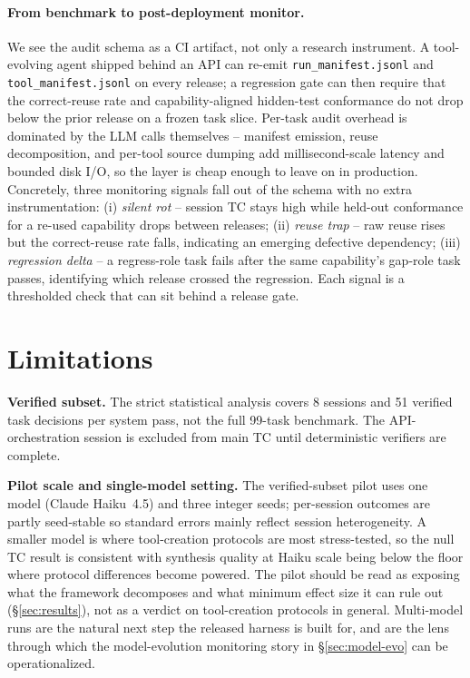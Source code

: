 \documentclass[sigconf,anonymous,natbib=false]{acmart}
\begin{document}
\paragraph{From benchmark to post-deployment monitor.}
\label{sec:deploy}
We see the audit schema as a CI artifact, not only a research instrument. A tool-evolving agent shipped behind an API can re-emit \texttt{run\_manifest.jsonl} and \texttt{tool\_manifest.jsonl} on every release; a regression gate can then require that the correct-reuse rate and capability-aligned hidden-test conformance do not drop below the prior release on a frozen task slice. Per-task audit overhead is dominated by the LLM calls themselves -- manifest emission, reuse decomposition, and per-tool source dumping add millisecond-scale latency and bounded disk I/O, so the layer is cheap enough to leave on in production. Concretely, three monitoring signals fall out of the schema with no extra instrumentation: (i) \emph{silent rot} -- session TC stays high while held-out conformance for a re-used capability drops between releases; (ii) \emph{reuse trap} -- raw reuse rises but the correct-reuse rate falls, indicating an emerging defective dependency; (iii) \emph{regression delta} -- a regress-role task fails after the same capability's gap-role task passes, identifying which release crossed the regression. Each signal is a thresholded check that can sit behind a release gate.

\section{Limitations}

\textbf{Verified subset.} The strict statistical analysis covers 8 sessions and 51 verified task decisions per system pass, not the full 99-task benchmark. The API-orchestration session is excluded from main TC until deterministic verifiers are complete.

\textbf{Pilot scale and single-model setting.} The verified-subset pilot uses one model (Claude Haiku~4.5) and three integer seeds; per-session outcomes are partly seed-stable so standard errors mainly reflect session heterogeneity. A smaller model is where tool-creation protocols are most stress-tested, so the null TC result is consistent with synthesis quality at Haiku scale being below the floor where protocol differences become powered. The pilot should be read as exposing what the framework decomposes and what minimum effect size it can rule out (\S\ref{sec:results}), not as a verdict on tool-creation protocols in general. Multi-model runs are the natural next step the released harness is built for, and are the lens through which the model-evolution monitoring story in \S\ref{sec:model-evo} can be operationalized.
\end{document}
